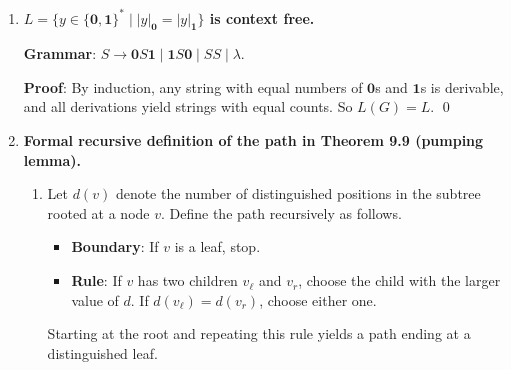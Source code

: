 \begin{enumerate}[{9.}1. ]
\begin{enumerate}
\item \textbf{Pumping theorem}: \emph{Yes}.  The ordinary pumping theorem also
works.  Assume $\Phi'$ is context free, and let $n$ be its pumping constant.
Take
\[
s=\pmb{b}\pmb{c}^{n^2}\pmb{d}^n \in \Phi'.
\]
Write $s=uvwxy$ with $|vwx|\leq n$ and $|vx|\geq 1$.

If $vx$ contains the initial $\pmb{b}$, then pumping down ($i=0$) removes that
only $\pmb{b}$, so $uv^0wx^0y\notin\Phi'$.

Otherwise, $vx$ lies entirely in the $\pmb{c}^*\pmb{d}^*$ portion of the word.
Let $\alpha=|vx|_{\pmb{c}}$ and $\beta=|vx|_{\pmb{d}}$.  Then
$\alpha+\beta\geq 1$ and $\alpha+\beta\leq n$.

If $\alpha=0$, pumping up changes the number of $\pmb{d}$'s while leaving the
number of $\pmb{c}$'s fixed, so the quadratic relation fails.

If $\beta=0$, pumping up changes the number of $\pmb{c}$'s while leaving the
number of $\pmb{d}$'s fixed, so the quadratic relation fails.

If both $\alpha$ and $\beta$ are positive, then pumping up gives
$n^2+\alpha$ occurrences of $\pmb{c}$ and $n+\beta$ occurrences of
$\pmb{d}$.  But
\[
(n+\beta)^2-n^2=2n\beta+\beta^2 > n \geq \alpha,
\]
so $n^2+\alpha \neq (n+\beta)^2$.  Thus the pumped word is not in $\Phi'$.

In every case some pumped word lies outside $\Phi'$, contradicting the pumping
theorem.  So it is possible to prove directly from the pumping theorem that
$\Phi'$ is not context free.
\end{enumerate}

\item \textbf{$L = \{y \in \{\pmb{0},\pmb{1}\}^* \mid |y|_{\pmb{0}} = |y|_{\pmb{1}}\}$ is context free.}

\textbf{Grammar}: $S \to \pmb{0}S\pmb{1} \mid \pmb{1}S\pmb{0} \mid SS \mid \lambda$.

\textbf{Proof}: By induction, any string with equal numbers of $\pmb{0}$s and $\pmb{1}$s is derivable, and all derivations yield strings with equal counts. So $L(G) = L$. \qed

\item \textbf{Formal recursive definition of the path in Theorem 9.9 (pumping lemma).}

\begin{enumerate}
\item Let $d(v)$ denote the number of distinguished positions in the subtree
rooted at a node $v$.  Define the path recursively as follows.
\begin{itemize}
\item \textbf{Boundary}: If $v$ is a leaf, stop.
\item \textbf{Rule}: If $v$ has two children $v_\ell$ and $v_r$, choose the
child with the larger value of $d$.  If $d(v_\ell)=d(v_r)$, choose either one.
\end{itemize}
Starting at the root and repeating this rule yields a path ending at a
distinguished leaf.


\end{enumerate}
\end{enumerate}
